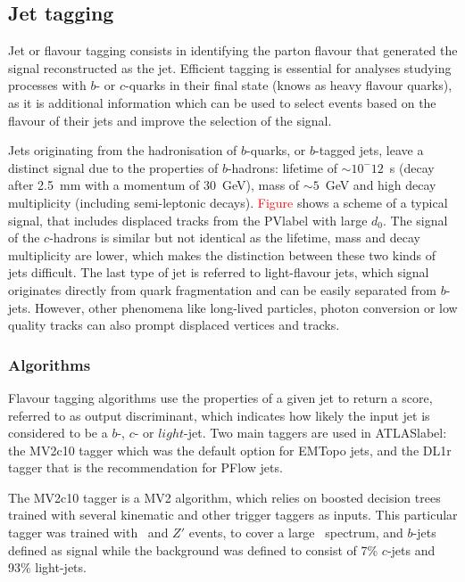 \subsection{Jet tagging}

Jet or flavour tagging consists in identifying the parton flavour that generated the signal reconstructed as the jet. Efficient tagging is essential for analyses studying processes with $b$- or $c$-quarks in their final state (knows as heavy flavour quarks), as it is additional information which can be used to select events based on the flavour of their jets and improve the selection of the signal.

Jets originating from the hadronisation of $b$-quarks, or $b$-tagged jets, leave a distinct signal due to the properties of $b$-hadrons: lifetime of $\sim 10^-12$~s (decay after 2.5~mm with a momentum of 30~GeV), mass of $\sim 5$~GeV and high decay multiplicity (including semi-leptonic decays). \textcolor{red}{Figure} shows a scheme of a typical signal, that includes displaced tracks from the \acrshort{PVlabel} with large $d_0$.
The signal of the $c$-hadrons is similar but not identical as the lifetime, mass and decay multiplicity are lower, which makes the distinction between these two kinds of jets difficult. The last type of jet is referred to light-flavour jets, which signal originates directly from quark fragmentation and can be easily separated from $b$-jets. However, other phenomena like long-lived particles, photon conversion or low quality tracks can also prompt displaced vertices and tracks.

\subsubsection{Algorithms}

Flavour tagging algorithms use the properties of a given jet to return a score, referred to as output discriminant, which indicates how likely the input jet is considered to be a $b$-, $c$- or $light$-jet. Two main taggers are used in \acrshort{ATLASlabel}: the MV2c10 tagger which was the default option for EMTopo jets, and the DL1r tagger that is the recommendation for PFlow jets.

The MV2c10 tagger  %
is a MV2 algorithm, which relies on boosted decision trees trained with several kinematic and other trigger taggers as inputs. This particular tagger was trained with \ttbar\ and $Z'$ events, to cover a large \pT\ spectrum, and $b$-jets defined as signal while the background was defined to consist of 7\% $c$-jets and 93\% light-jets.

